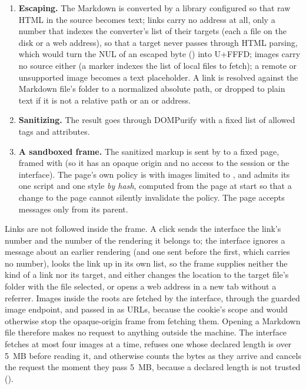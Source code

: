 \begin{enumerate}
  \item \textbf{Escaping.}  The Markdown is converted by a library configured so that raw HTML
        in the source becomes text; links carry no address at all, only a number that indexes
        the converter's list of their targets (each a file on the disk or a web address),
        so that a target never passes through HTML parsing, which would turn the NUL of an
        escaped byte () into U+FFFD; images carry no source either (a marker
        indexes the list of local files to fetch); a remote or unsupported image becomes a text placeholder.  A link is
        resolved against the Markdown file's folder to a normalized absolute path, or dropped
        to plain text if it is not a relative path or an  or  address.
  \item \textbf{Sanitizing.}  The result goes through DOMPurify with a fixed list of allowed
        tags and attributes.
  \item \textbf{A sandboxed frame.}  The sanitized markup is sent by  to a fixed
        page, framed with  (so it has an opaque origin and no access
        to the session or the interface).  The page's own policy is 
        with images limited to , and admits its one script and one style
        \emph{by hash}, computed from the page at start so that a change to the page cannot
        silently invalidate the policy.  The page accepts messages only from its parent.
\end{enumerate}

Links are not followed inside the frame.  A click sends the interface the link's number and
the number of the rendering it belongs to; the interface ignores a message about an earlier
rendering (and one sent before the first, which carries no number), looks the link up in its own list, so the frame supplies neither the kind of a
link nor its target, and either changes the location to the target file's folder with the file selected,
or opens a web address in a new tab without a referrer.  Images inside the roots are fetched by
the interface, through the guarded image endpoint, and passed in as  URLs, because the
cookie's scope and  would otherwise stop the opaque-origin frame from fetching them.
Opening a Markdown file therefore makes no request to anything outside the machine.  The
interface fetches at most four images at a time, refuses one whose declared length is over
5~MB before reading it, and otherwise counts the bytes as they arrive and cancels the
request the moment they pass 5~MB, because a declared length is not trusted
().
